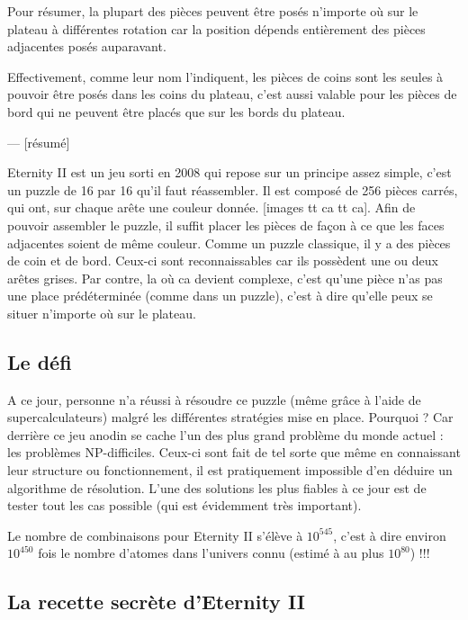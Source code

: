 \documentclass{article}
\begin{document}
	Pour résumer, la plupart des pièces peuvent être posés n'importe où sur le plateau à différentes rotation car la position dépends entièrement des pièces adjacentes posés auparavant. 
	
	Effectivement, comme leur nom l'indiquent, les pièces de coins sont les seules à pouvoir être posés dans les coins du plateau, c'est aussi valable pour les pièces de bord qui ne peuvent être placés que sur les bords du plateau.
	
	
	--- [résumé]
	
	Eternity II est un jeu sorti en 2008 qui repose sur un principe assez simple, c'est un puzzle de 16 par 16 qu'il faut réassembler. Il est composé de 256 pièces carrés, qui ont, sur chaque arête une couleur donnée. [images tt ca tt ca]. Afin de pouvoir assembler le puzzle, il suffit placer les pièces de façon à ce que les faces adjacentes soient de même couleur. Comme un puzzle classique, il y a des pièces de coin et de bord. Ceux-ci sont reconnaissables car ils possèdent une ou deux arêtes grises. Par contre, la où ca devient complexe, c'est qu'une pièce n'as pas une place prédéterminée (comme dans un puzzle), c'est à dire qu'elle peux se situer n'importe où sur le plateau. 
	
	\subsection{Le défi}
	
	A ce jour, personne n'a réussi à résoudre ce puzzle (même grâce à l'aide de supercalculateurs) malgré les différentes stratégies mise en place. Pourquoi ? Car derrière ce jeu anodin se cache l'un des plus grand problème du monde actuel : les problèmes NP-difficiles. Ceux-ci sont fait de tel sorte que même en connaissant leur structure ou fonctionnement, il est pratiquement impossible d'en déduire un algorithme de résolution. L'une des solutions les plus fiables à ce jour est de tester tout les cas possible (qui est évidemment très important).
	
	\begin{exmp}
		Le nombre de combinaisons pour Eternity II s'élève à $10^{545}$, c'est à dire environ $10^{450}$ fois le nombre d'atomes dans l'univers connu (estimé à au plus $10^{80}$) !!!
	\end{exmp}
	
	\subsection{La recette secrète d'Eternity II}
	
\end{document}
